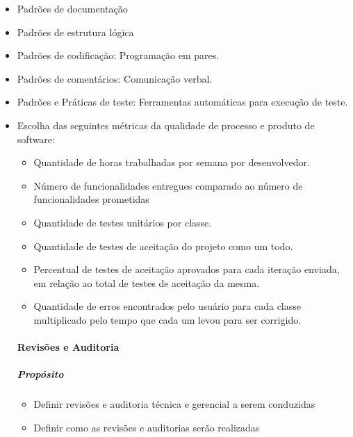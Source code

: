 \begin{itemize}
\item Padrões de documentação

\item Padrões de estrutura lógica

\item Padrões de codificação: Programação em pares.

\item Padrões de comentários: Comunicação verbal.

\item Padrões e Práticas de teste: Ferramentas automáticas para execução de teste.

\item Escolha das seguintes métricas da qualidade de processo e produto de software:
   \begin{itemize}
  \item Quantidade de horas trabalhadas por semana por desenvolvedor.
  \item Número de funcionalidades entregues comparado ao número de funcionalidades prometidas

    \item Quantidade de testes unitários por classe.

    \item Quantidade de testes de aceitação do projeto como um todo.

    \item Percentual de testes de aceitação aprovados para cada iteração enviada, em relação ao total de testes de aceitação da mesma.

    \item Quantidade de erros encontrados pelo usuário para cada classe multiplicado pelo tempo que cada um levou para ser corrigido.
  \end{itemize}
  
\paragraph{Revisões e Auditoria}

\subparagraph{Propósito}

\begin{itemize}

\item Definir revisões e auditoria técnica e gerencial a serem conduzidas

\item Definir como as revisões e auditorias serão realizadas


\end{itemize}
\end{itemize}

